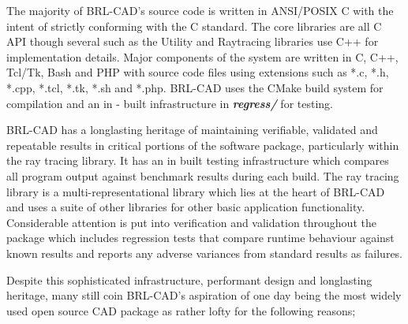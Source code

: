 \hspace{30} The   majority   of   BRL-­CAD's   source   code   is   written   in   ANSI/POSIX   C   with   the  
intent   of   strictly   conforming   with   the   C   standard.   The   core   libraries   are   all   C   API  
though   several   such   as   the   Utility   and   Ray­tracing   libraries   use   C++   for  
implementation   details.   Major   components   of   the   system   are   written   in   C,   C++,  
Tcl/Tk,   Bash   and   PHP   with   source   code   files   using   extensions   such   as   *.c,   *.h,  
*.cpp,   *.tcl,   *.tk,   *.sh   and   *.php.   BRL­-CAD   uses   the   CMake   build   system   for  
compilation and an in - built infrastructure in \textit{\textbf{regress/}} for testing.  

\hspace{30} BRL-­CAD   has   a   long­lasting   heritage   of   maintaining   verifiable,   validated  
and   repeatable   results   in   critical   portions   of   the   software   package,   particularly  
within   the   ray   tracing   library.   It   has   an   in built   testing   infrastructure   which  
compares   all   program   output   against   benchmark   results   during   each   build.   The  
ray   tracing   library   is   a   multi-­representational   library   which   lies   at   the   heart   of  
BRL­-CAD   and   uses   a   suite   of   other   libraries   for   other   basic   application  
functionality.   Considerable   attention   is   put   into   verification   and   validation  
throughout   the   package   which   includes   regression   tests   that   compare   runtime  
behaviour   against   known   results   and   reports   any   adverse   variances   from  
standard results as failures.  

\hspace{30} Despite   this   sophisticated   infrastructure,   performant   design   and  
long­lasting   heritage,   many   still   coin   BRL-­CAD's   aspiration   of   one   day   being   the  
most   widely   used   open   source   CAD   package   as   rather   lofty for the following reasons;

